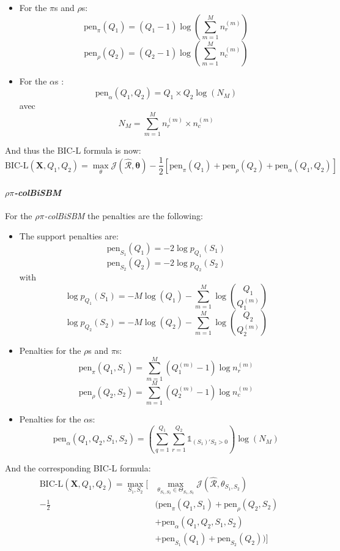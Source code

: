 \documentclass[12pt,a4paper]{report}
\begin{document}
\begin{itemize}
    \item For the $\pi$s and $\rho$s:
    \[\text{pen}_{\pi}(Q_1) = (Q_1 - 1)\log(\sum_{m=1}^{M}n_{r}^{(m)})\]
    \[\text{pen}_{\rho}(Q_2) = (Q_2 - 1)\log(\sum_{m=1}^{M}n_{c}^{(m)})\]
    \item For the $\alpha$s :
    \[\text{pen}_{\alpha}(Q_1, Q_2) = Q_1 \times Q_2 \log(N_M)\]
    avec
    \[ N_M = \sum_{m = 1}^{M} n_{r}^{(m)} \times n_{c}^{(m)} \]
\end{itemize}
And thus the $\text{BIC-L}$ formula is now:
\[ \text{BIC-L}(\bm{X},Q_1, Q_2) = \max_{\theta} \mathcal{J} (\mathcal{\hat{R}}, \bm{\theta}) 
- \frac{1}{2} [\text{pen}_{\pi}(Q_1) + \text{pen}_{\rho}(Q_2) + \text{pen}_{\alpha}(Q_1, Q_2)]\]

\paragraph*{\textit{$\rho\pi$-colBiSBM}}
For the \textit{$\rho\pi$-colBiSBM} the penalties are the following:

\begin{itemize}
    \item The support penalties are:
    \[ \text{pen}_{S_1}(Q_1) = -2 \log p_{Q_1} (S_1) \]
    \[ \text{pen}_{S_2}(Q_2) = -2 \log p_{Q_2} (S_2) \]
    with
    \[ \log p_{Q_1}(S_1) = - M \log(Q_1) - \sum_{m=1}^{M} \log {Q_1 \choose Q_1^{(m)}} \]
    \[ \log p_{Q_2}(S_2) = - M \log(Q_2) - \sum_{m=1}^{M} \log {Q_2 \choose Q_2^{(m)}} \]
    \item Penalties for the $\rho$s and $\pi$s:
    \[ \text{pen}_{\pi}(Q_1, S_1) = \sum_{m=1}^{M} (Q_{1}^{(m)} - 1) \log n_{r}^{(m)} \]
    \[ \text{pen}_{\rho}(Q_2, S_2) = \sum_{m=1}^{M} (Q_{2}^{(m)} - 1) \log n_{c}^{(m)} \]
    \item Penalties for the $\alpha$s:
    \[ \text{pen}_{\alpha}(Q_1, Q_2, S_1, S_2) = (\sum_{q=1}^{Q_1} \sum_{r=1}^{Q_2} \mathbb{1}_{(S_1)'S_2 > 0}) \log (N_M) \]
\end{itemize}
And the corresponding BIC-L formula:
\[
    \begin{aligned}
        \text{BIC-L}(\bm{X},Q_1, Q_2) = 
        \max_{S_1,S_2} [
            & \max_{\theta_{S_1,S_2} \in \Theta_{S_1,S_2}} \mathcal{J}(\mathcal{\hat{R}},\theta_{S_1,S_2})\\
            - \frac{1}{2} & (\text{pen}_{\pi}(Q_1, S_1)  + \text{pen}_{\rho}(Q_2, S_2)\\
            &+ \text{pen}_{\alpha}(Q_1, Q_2, S_1, S_2)\\
            &+ \text{pen}_{S_1}(Q_1) + \text{pen}_{S_2}(Q_2))]\\
    \end{aligned}
\]
\end{document}
